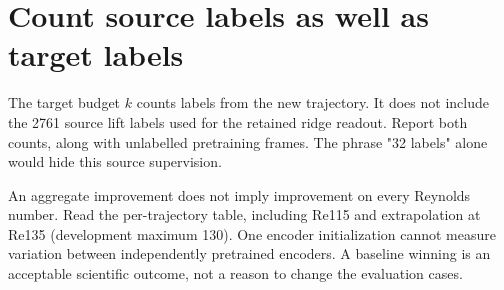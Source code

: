 \section*{Count source labels as well as target labels}
The target budget $k$ counts labels from the new trajectory. It does not include
the 2761 source lift labels used for the retained ridge readout. Report both
counts, along with unlabelled pretraining frames. The phrase "32 labels" alone
would hide this source supervision.

An aggregate improvement does not imply improvement on every Reynolds number.
Read the per-trajectory table, including Re115 and extrapolation at Re135
(development maximum 130). One encoder initialization cannot measure variation
between independently pretrained encoders. A baseline winning is an acceptable
scientific outcome, not a reason to change the evaluation cases.
